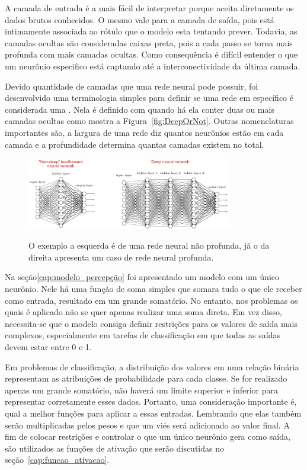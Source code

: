             A camada de entrada é a mais fácil de interpretar porque aceita diretamente os dados brutos conhecidos. O mesmo vale para a camada de saída, pois está intimamente associada ao rótulo que o modelo esta tentando prever. Todavia, as camadas ocultas são consideradas caixas preta, pois a cada passo se torna mais profunda com mais camadas ocultas. Como consequência é difícil entender o que um neurônio especifico está captando até a interconectividade da última camada.
            
            Devido quantidade de camadas que uma rede neural pode possuir, foi desenvolvido uma terminologia simples para definir se uma rede em específico é considerada uma \rn. Nela é definido com \rn quando há ela conter duas ou mais camadas ocultas como mostra a Figura~\ref{fig:DeepOrNot}. Outras nomenclaturas importantes são, a largura de uma rede diz quantos neurônios estão em cada camada e a profundidade determina quantas camadas existem no total.
    
            \begin{figure}[H]
                \centering
                \caption{O exemplo a esquerda é de uma rede neural não profunda, já o da direita apresenta um caso de rede neural profunda.}
                \includegraphics[width=0.8\textwidth]{fig/2-fundamentacao/multiplas camadas/deepOrNot.png}
                \fonte{}
                \label{fig:multicamadas}
            \end{figure}
            
            Na seção\ref{cap:modelo_percepção} foi apresentado um modelo com um único neurônio. Nele há uma função de soma simples que somara tudo o que ele receber como entrada, resultado em um grande somatório. No entanto, nos problemas os quais \ap é aplicado não se quer apenas realizar uma soma direta. Em vez disso, necessita-se que o modelo consiga definir restrições para os valores de saída mais complexos, especialmente em tarefas de classificação em que todas as saídas devem estar entre 0 e 1. 
            
            Em problemas de classificação, a distribuição dos valores em uma relação binária representam as atribuições de probabilidade para cada classe. Se for realizado apenas um grande somatório, não haverá um limite superior e inferior para representar corretamente esses dados. Portanto, uma consideração importante é, qual a melhor funções para aplicar a essas entradas. Lembrando que elas também serão multiplicadas pelos pesos e que um viés será adicionado ao valor final. A fim de colocar restrições e controlar o que um único neurônio gera como saída, são utilizados as funções de ativação que serão discutidas no seção~\ref{cap:funcao_ativacao}.
            
